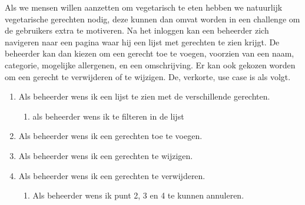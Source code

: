Als we mensen willen aanzetten om vegetarisch te eten hebben we natuurlijk vegetarische
gerechten nodig, deze kunnen dan omvat worden in een challenge om de gebruikers extra te
motiveren. Na het inloggen kan een beheerder zich navigeren naar een pagina waar hij een lijst
met gerechten te zien krijgt. De beheerder kan dan kiezen om een gerecht toe te voegen, voorzien
van een naam, categorie, mogelijke allergenen, en een omschrijving. Er kan ook gekozen worden
om een gerecht te verwijderen of te wijzigen. De, verkorte, use case is als volgt.

\begin{enumerate}
	\item Als beheerder wens ik een lijst te zien met de verschillende gerechten.
	\begin{enumerate}
		\item als beheerder wens ik te filteren in de lijst
	\end{enumerate}
	\item Als beheerder wens ik een gerechten toe te voegen.
	\item Als beheerder wens ik een gerechten te wijzigen.
	\item Als beheerder wens ik een gerechten te verwijderen.
	\begin{enumerate}
		\item Als beheerder wens ik punt 2, 3 en 4 te kunnen annuleren.
	\end{enumerate}
\end{enumerate}





